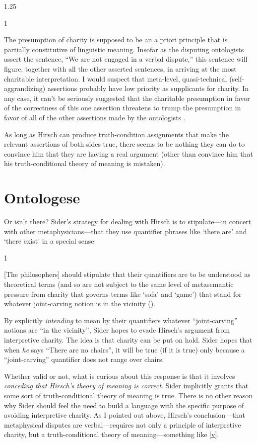 \documentclass[12pt,twoside]{reedfancy}
\newenvironment{squote}{%
	\begin{spacing}{1}
	\begin{list}{}{%
	\setlength{\labelwidth}{0pt}%
	\rightmargin\leftmargin%
	}
	\item\relax
	}{%
	\end{list}%
	\end{spacing}
	}
\begin{document}
\begin{spacing}{1.25}
\begin{squote}
The presumption of charity is supposed to be an a priori principle
that is partially constitutive of linguistic meaning.  Insofar as the
disputing ontologists assert the sentence, ``We are not engaged in a
verbal dispute,'' this sentence will figure, together with all the
other asserted sentences, in arriving at the most charitable
interpretation.  I would suspect that meta-level, quasi-technical
(self-aggrandizing) assertions probably have low priority as
supplicants for charity.  In any case, it can't be seriously suggested
that the charitable presumption in favor of the correctness of this
one assertion threatens to trump the presumption in favor of all of
the other assertions made by the ontologists
\citeyearpar[515]{hirsch2008}.
\end{squote}

As long as Hirsch can produce truth-condition assignments that make
the relevant assertions of both sides true, there seems to be nothing
they can do to convince him that they are having a real argument
(other than convince him that his truth-conditional theory of meaning
is mistaken).

\section{Ontologese}
\label{ontologese}
Or isn't there?  Sider's strategy for dealing with Hirsch is to
stipulate---in concert with other metaphysicians---that they use
quantifier phrases like `there are' and `there exist' in a special
sense:

\begin{squote}
{[}The philosophers{]} should stipulate that their quantifiers are to be
understood as theoretical terms (and so are not subject to the same
level of metasemantic pressure from charity that governs terms like
`sofa' and `game') that stand for whatever joint-carving notion is in
the vicinity (\citeyear[9]{sider2011b}).
\end{squote}

By explicitly \emph{intending} to mean by their quantifiers whatever
``joint-carving'' notions are ``in the vicinity'', Sider hopes to
evade Hirsch's argument from interpretive charity.  The idea is that
charity can be put on hold.  Sider hopes that when {\em he} says
``There are no chairs'', it will be true (if it is true) only because
a ``joint-carving'' quantifier does not range over chairs.

Whether valid or not, what is curious about this response is that it
involves {\em conceding that Hirsch's theory of meaning is correct}.
Sider implicitly grants that some sort of truth-conditional theory of
meaning is true.  There is no other reason why Sider should feel the
need to build a language with the specific purpose of avoiding
interpretive charity.  As I pointed out above, Hirsch's
conclusion---that metaphysical disputes are verbal---requires not only
a principle of interpretive charity, but a truth-conditional theory of
meaning---something like \ref{v}.


\end{spacing}
\end{document}
